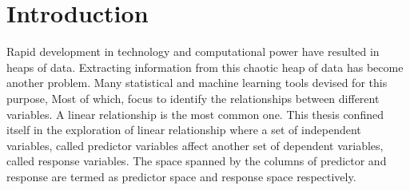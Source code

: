 \documentclass[11pt,twoside,openright,titlepage,
  headinclude,footinclude,BCOR=5mm,
  numbers=noenddot,cleardoublepage=empty,
  tablecaptionabove, dottedtoc,
  bibliography=totoc,paper=a4]{scrreprt}
\begin{document}
\begingroup
\cleardoublepage
{}

\endgroup

\begingroup
\cleardoublepage
{}

\endgroup


\cleardoublepage
{}
{}
\setcounter{tocdepth}{1}
\begingroup 
  \let\clearpage\relax
  \let\cleardoublepage\relax
    \tableofcontents
\endgroup
\markboth{\spacedlowsmallcaps{\contentsname}}
{\spacedlowsmallcaps{\contentsname}} 

\begingroup

\setcounter{secnumdepth}{-\maxdimen} %

\listoffigures
\vfill
\endgroup

\begingroup 
  \let\clearpage\relax
  \let\cleardoublepage\relax
\endgroup

\cleardoublepage



\pagestyle{scrheadings} 

\hypertarget{introduction}{%
\chapter{Introduction}\label{introduction}}

Rapid development in technology and computational power have resulted in heaps of data. Extracting information from this chaotic heap of data has become another problem. Many statistical and machine learning tools devised for this purpose, Most of which, focus to identify the relationships between different variables. A linear relationship is the most common one. This thesis confined itself in the exploration of linear relationship where a set of independent variables, called predictor variables affect another set of dependent variables, called response variables. The space spanned by the columns of predictor and response are termed as predictor space and response space respectively.
\end{document}
